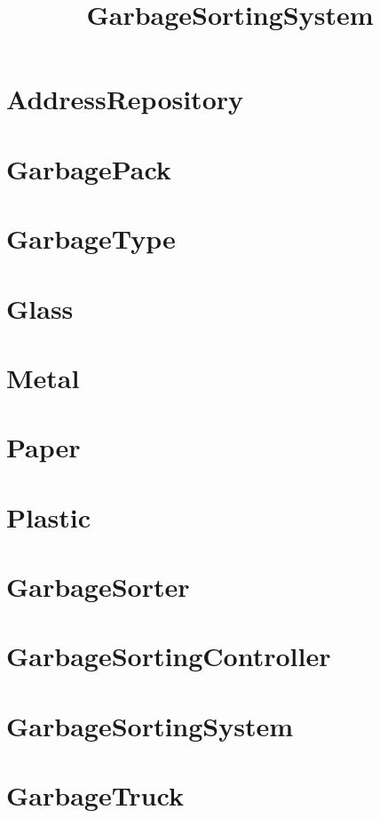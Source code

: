 \documentclass{article}
\begin{document}
\title{GarbageSortingSystem}
\author{}
\maketitle
\tableofcontents

\section{AddressRepository}

\section{GarbagePack}

\section{GarbageType}

\section{Glass}

\section{Metal}

\section{Paper}

\section{Plastic}

\section{GarbageSorter}

\section{GarbageSortingController}

\section{GarbageSortingSystem}

\section{GarbageTruck}

\end{document}
